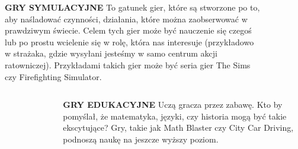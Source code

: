 \documentclass{beamer}
\begin{document}
\begin{frame} %
\begin{columns}
\begin{column}{0.5\textwidth}
        \normalsize \textbf {GRY SYMULACYJNE}
\newline
\small To gatunek gier, które są stworzone po to, aby naśladować czynności, działania, które można zaobserwować w prawdziwym świecie. Celem tych gier może być nauczenie się czegoś lub po prostu wcielenie się w rolę, która nas interesuje (przykładowo w strażaka, gdzie wysyłani jesteśmy w samo centrum akcji ratowniczej). Przykładami takich gier może być seria gier The Sims czy Firefighting Simulator.

\end{column}
\begin{column}{0.5\textwidth}
    \begin{figure}
    \centering
        \includegraphics[width=6cm,height=3cm]{SIMS.png}
\end{figure}
\end{column}
\end{columns}
\end{frame}

\begin{frame} %
\begin{columns}
\begin{column}{0.5\textwidth}
    \begin{figure}
    \centering
        \includegraphics[width=5cm,height=6.5cm]{MB.jpg}
\end{figure}
\end{column}

\begin{column}{0.5\textwidth}
	   \normalsize \textbf {GRY EDUKACYJNE}
\newline
 \small Uczą gracza przez zabawę. Kto by pomyślał, że matematyka, języki, czy historia mogą być takie ekscytujące? Gry, takie jak Math Blaster czy City Car Driving, podnoszą naukę na jeszcze wyższy poziom. 

\end{column}
\end{columns}
\end{frame}
\end{document}
